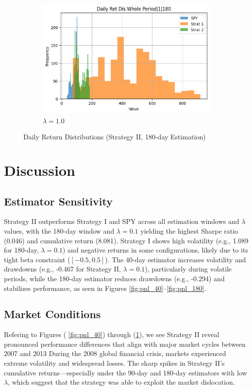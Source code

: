 \documentclass[12pt]{article}
\begin{document}
\begin{figure}[H]
\begin{subfigure}{0.32\textwidth}
\includegraphics[width=\linewidth]{"plots/daily_ret_dis_whole_period_1_180.png"}
\caption{$\lambda=1.0$}
\end{subfigure}
\caption{Daily Return Distributions (Strategy II, 180-day Estimation)}
\label{fig:ret_dist_180}
\end{figure}


\section{Discussion}

\subsection{Estimator Sensitivity}
Strategy II outperforms Strategy I and SPY across all estimation windows and $\lambda$ values, with the 180-day window and $\lambda=0.1$ yielding the highest Sharpe ratio (0.046) and cumulative return (8.081). Strategy I shows high volatility (e.g., 1.089 for 180-day, $\lambda=0.1$) and negative returns in some configurations, likely due to its tight beta constraint ($[-0.5, 0.5]$). The 40-day estimator increases volatility and drawdowns (e.g., -0.467 for Strategy II, $\lambda=0.1$), particularly during volatile periods, while the 180-day estimator reduces drawdowns (e.g., -0.294) and stabilizes performance, as seen in Figures \ref{fig:pnl_40}--\ref{fig:pnl_180}.

\subsection{Market Conditions}
Refering to Figures ( \ref{fig:pnl_40}) through (\ref{fig:ret_dist_180}), we see Strategy II reveal pronounced performance differences that align with major market cycles between 2007 and 2013 During the 2008 global financial crisis, markets experienced extreme volatility and widespread losses. The sharp spikes in Strategy II’s cumulative returns—especially under the 90-day and 180-day estimators with low $\lambda$, which suggest that the strategy was able to exploit the market dislocation.
\end{document}

